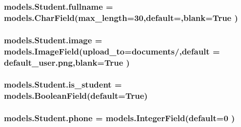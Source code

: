 \subsubsection[{\texorpdfstring{fullname}{fullname}}]{\setlength{\rightskip}{0pt plus 5cm}models.\+Student.\+fullname = models.\+Char\+Field(max\+\_\+length=30,default=\textquotesingle{}\textquotesingle{},blank=True )\hspace{0.3cm}{\ttfamily [static]}}\hypertarget{classmodels_1_1_student_ab4ed9dee0a1821211cf1c01a20a1d47a}{}\label{classmodels_1_1_student_ab4ed9dee0a1821211cf1c01a20a1d47a}
\subsubsection[{\texorpdfstring{image}{image}}]{\setlength{\rightskip}{0pt plus 5cm}models.\+Student.\+image = models.\+Image\+Field(upload\+\_\+to=\textquotesingle{}documents/\textquotesingle{},default = \textquotesingle{}default\+\_\+user.\+png\textquotesingle{},blank=True )\hspace{0.3cm}{\ttfamily [static]}}\hypertarget{classmodels_1_1_student_abcc5eda4213b411b56e55ab7627a5fe0}{}\label{classmodels_1_1_student_abcc5eda4213b411b56e55ab7627a5fe0}
\subsubsection[{\texorpdfstring{is\+\_\+student}{is_student}}]{\setlength{\rightskip}{0pt plus 5cm}models.\+Student.\+is\+\_\+student = models.\+Boolean\+Field(default=True)\hspace{0.3cm}{\ttfamily [static]}}\hypertarget{classmodels_1_1_student_a9d3cb9ca10feca6110cd0bcf89145e7c}{}\label{classmodels_1_1_student_a9d3cb9ca10feca6110cd0bcf89145e7c}
\subsubsection[{\texorpdfstring{phone}{phone}}]{\setlength{\rightskip}{0pt plus 5cm}models.\+Student.\+phone = models.\+Integer\+Field(default=0 )\hspace{0.3cm}{\ttfamily [static]}}\hypertarget{classmodels_1_1_student_a86dc47ebb9cf9848a3b8e5b72adaee3a}{}\label{classmodels_1_1_student_a86dc47ebb9cf9848a3b8e5b72adaee3a}
